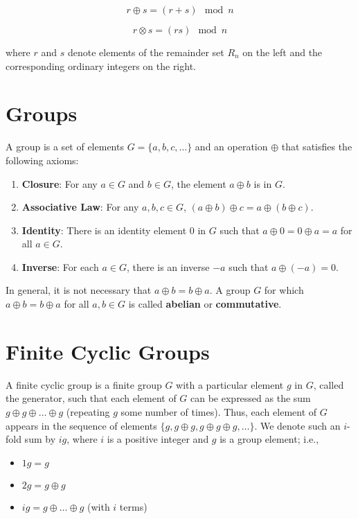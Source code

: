 \documentclass[11pt, letterpaper]{article}
\begin{document}
\[
r \oplus s = (r + s) \mod n
\]

\[
r \otimes s = (rs) \mod n
\]

where \( r \) and \( s \) denote elements of the remainder set \( R_n \) on the left and the corresponding ordinary integers on the right.

\section{Groups}

A group is a set of elements \( G = \{a, b, c, \ldots\} \) and an operation \( \oplus \) that satisfies the following axioms:

\begin{enumerate}
    \item \textbf{Closure}: For any \( a \in G \) and \( b \in G \), the element \( a \oplus b \) is in \( G \).
    \item \textbf{Associative Law}: For any \( a, b, c \in G \), \( (a \oplus b) \oplus c = a \oplus (b \oplus c) \).
    \item \textbf{Identity}: There is an identity element 0 in \( G \) such that \( a \oplus 0 = 0 \oplus a = a \) for all \( a \in G \).
    \item \textbf{Inverse}: For each \( a \in G \), there is an inverse \(-a\) such that \( a \oplus (-a) = 0 \).
\end{enumerate}

In general, it is not necessary that \( a \oplus b = b \oplus a \). A group \( G \) for which \( a \oplus b = b \oplus a \) for all \( a, b \in G \) is called \textbf{abelian} or \textbf{commutative}.

\section{Finite Cyclic Groups}

A finite cyclic group is a finite group \( G \) with a particular element \( g \) in \( G \), called the generator, such that each element of \( G \) can be expressed as the sum \( g \oplus g \oplus \ldots \oplus g \) (repeating \( g \) some number of times). Thus, each element of \( G \) appears in the sequence of elements \(\{g, g \oplus g, g \oplus g \oplus g, \ldots\}\). We denote such an \( i \)-fold sum by \( ig \), where \( i \) is a positive integer and \( g \) is a group element; i.e.,

\begin{itemize}
    \item \( 1g = g \)
    \item \( 2g = g \oplus g \)
    \item \( ig = g \oplus \ldots \oplus g \) (with \( i \) terms)
\end{itemize}
\end{document}
